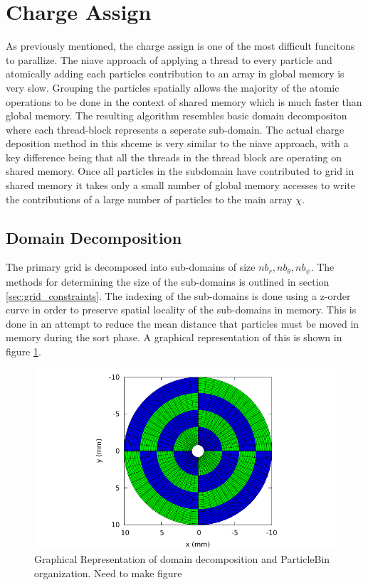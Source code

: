 	\section{Charge Assign}
	\label{sec:charge_assign}
	As previously mentioned, the charge assign is one of the most difficult funcitons to parallize. The niave approach of applying a thread to every particle and atomically adding each particles contribution to an array in global memory is very slow. Grouping the particles spatially allows the majority of the atomic operations to be done in the context of shared memory which is much faster than global memory. The resulting algorithm resembles basic domain decompositon where each thread-block represents a seperate sub-domain. The actual charge deposition method in this shceme is very similar to the niave approach, with a key difference being that all the threads in the thread block are operating on shared memory. Once all particles in the subdomain have contributed to grid in shared memory it takes only a small number of global memory accesses to write the contributions of a large number of particles to the main array $\chi$. 

	\subsection{Domain Decomposition}
		The primary grid is decomposed into sub-domains of size $nb_r, nb_{\theta}, nb_{\psi}$. The methods for determining the size of the sub-domains is outlined in section \ref{sec:grid_constraints}. The indexing of the sub-domains is done using a z-order curve in order to preserve spatial locality of the sub-domains in memory. This is done in an attempt to reduce the mean distance that particles must be moved in memory during the sort phase. A graphical representation of this is shown in figure \ref{fig:domain_decomp}.

\begin{figure}
\begin{center}
\includegraphics[width=5in]{implementation/zorder_sceptic.pdf}
\end{center}
\caption{Graphical Representation of domain decomposition and ParticleBin organization. Need to make figure}
\label{fig:domain_decomp}
\end{figure}

